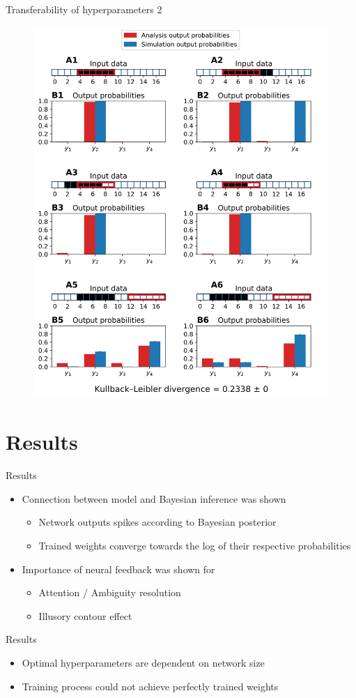 \documentclass[aspectratio=169]{beamer}
\begin{document}
\begin{frame}{Transferability of hyperparameters 2}
 \vspace{-1.0cm}
		\begin{figure}
        \includegraphics[width=0.4\linewidth]{../Latex/figures/1D/doubleSize/doubleSize_98_880_4.png}
      \end{figure} 
\end{frame}

\section{Results}

\begin{frame}{Results}
	\vspace{-0.5cm}
    \begin{itemize}    
    \item Connection between model and Bayesian inference was shown
    \begin{itemize}
      \item Network outputs spikes according to Bayesian posterior
      \item Trained weights converge towards the log of their respective probabilities
    \end{itemize}
    \item Importance of neural feedback was shown for 
    \begin{itemize}
	  \item Attention / Ambiguity resolution
	  \item Illusory contour effect
    \end{itemize}   
  \end{itemize}
\end{frame}

\begin{frame}{Results}
  \begin{itemize}
      \item Optimal hyperparameters are dependent on network size
    \item Training process could not achieve perfectly trained weights 
  \end{itemize}
\end{frame}
\end{document}
